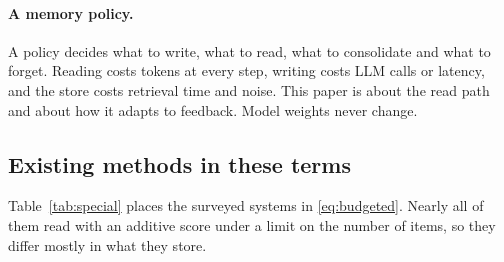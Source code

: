 \paragraph{A memory policy.} A policy decides what to write, what to read, what to consolidate and what to forget. Reading costs tokens at every step, writing costs LLM calls or latency, and the store costs retrieval time and noise. This paper is about the read path and about how it adapts to feedback. Model weights never change.

\subsection{Existing methods in these terms}\label{sec:special}
Table~\ref{tab:special} places the surveyed systems in \eqref{eq:budgeted}. Nearly all of them read with an additive score under a limit on the number of items, so they differ mostly in what they store.

